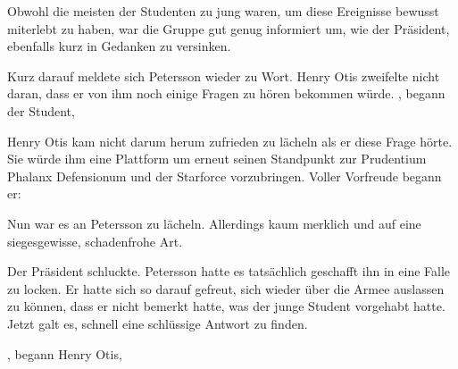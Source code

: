 \par

Obwohl die meisten der Studenten zu jung waren, um diese Ereignisse bewusst miterlebt zu haben, war die Gruppe gut genug informiert um, wie der Präsident, ebenfalls kurz in Gedanken zu versinken.

\par

Kurz darauf meldete sich Petersson wieder zu Wort. Henry Otis zweifelte nicht daran, dass er von ihm noch einige Fragen zu hören bekommen würde. , begann der Student, 

\par

Henry Otis kam nicht darum herum zufrieden zu lächeln als er diese Frage hörte. Sie würde ihm eine Plattform um erneut seinen Standpunkt zur Prudentium Phalanx Defensionum und der Starforce vorzubringen. Voller Vorfreude begann er: 

\par

Nun war es an Petersson zu lächeln. Allerdings kaum merklich und auf eine siegesgewisse, schadenfrohe Art. 

\par

Der Präsident schluckte. Petersson hatte es tatsächlich geschafft ihn in eine Falle zu locken. Er hatte sich so darauf gefreut, sich wieder über die Armee auslassen zu können, dass er nicht bemerkt hatte, was der junge Student vorgehabt hatte. Jetzt galt es, schnell eine schlüssige Antwort zu finden.

\par

, begann Henry Otis, 


